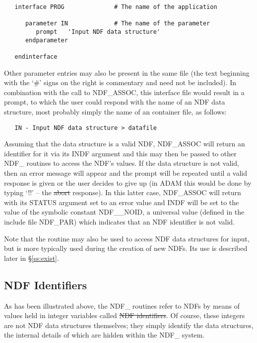 \small
\begin{verbatim}
   interface PROG              # The name of the application

      parameter IN             # The name of the parameter
         prompt   'Input NDF data structure'
      endparameter

   endinterface
\end{verbatim}
\normalsize

Other parameter entries may also be present in the same file (the text
beginning with the `\#' signs on the right is commentary and need not be
included). 
In combination with the call to NDF\_ASSOC, this interface file would
result in a prompt, to which the user could respond with the name of
an NDF data structure, most probably simply the name of an
 container file, as follows:

\small
\begin{verbatim}
   IN - Input NDF data structure > datafile
\end{verbatim}
\normalsize

Assuming that the data structure is a valid NDF, NDF\_ASSOC will return an
identifier for it via its INDF argument and  this may then be passed to other
NDF\_ routines to access the NDF's values.
If the data structure is not valid, then an error message will appear
and the prompt will be repeated until a valid response is given or the
user decides to give up (in ADAM this would be done by typing `!!' --
the \st{abort\/} response).
In this latter case, NDF\_ASSOC will return with its STATUS argument set to
an error value and INDF will be set to the value of the symbolic constant
NDF\_\_NOID, a universal value (defined in the include file NDF\_PAR) which
indicates that an NDF identifier is not valid. 

Note that the routine  may also be used to access NDF data 
structures for input, but is more typically used during the creation of new 
NDFs.
Its use is described later in \S\ref{ss:exist}.

\subsection{\label{ss:identifiers}NDF Identifiers}

As has been illustrated above, the NDF\_ routines refer to NDFs by means of
values held in integer variables called \st{NDF identifiers}. 
Of course, these integers are not NDF data structures themselves; they simply
identify the data structures, the internal details of which are hidden within
the NDF\_ system.

